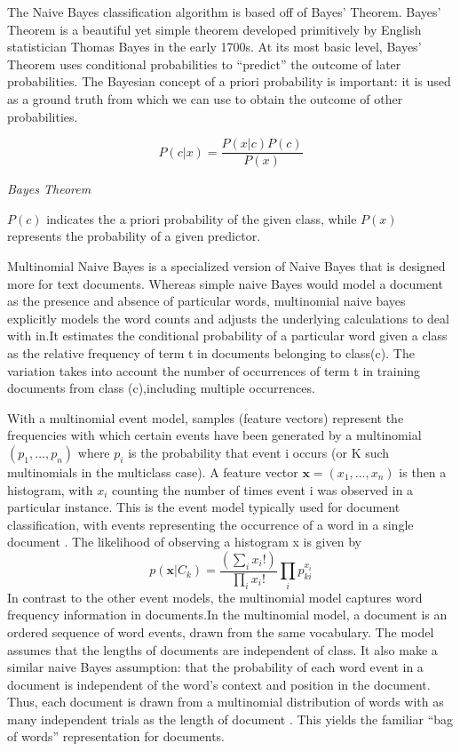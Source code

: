 \documentclass[12pt,a4paper,final]{extreport}
\begin{document}
\vspace{0.5cm}
The Naive Bayes classification algorithm is based off of Bayes’ Theorem. Bayes’ Theorem is a beautiful yet simple theorem developed primitively by English statistician Thomas Bayes in the early 1700s. At its most basic level, Bayes’ Theorem uses conditional probabilities to “predict” the outcome of later probabilities. The Bayesian concept of a priori probability is important: it is used as a ground truth from which we can use to obtain the outcome of other probabilities.
\begin{mycapequ}[!ht] 
\[ P(c|x) = \frac{P(x|c)P(c)}{P(x)} \]
\caption{\textit{Bayes Theorem}}
\end{mycapequ}

$P(c)$ indicates the a priori probability of the given class, while $P(x)$ represents the probability of a given predictor.

\vspace{0.5cm}
Multinomial Naive Bayes is a specialized version of Naive Bayes that is designed more for text documents. Whereas simple naive Bayes would model a document as the presence and absence of particular words, multinomial naive bayes explicitly models the word counts and adjusts the underlying calculations to deal with in.It estimates the conditional probability of a particular word given a class as the relative frequency of term t in documents belonging to class(c). The variation takes into account the number of occurrences of term t in training documents from class (c),including multiple occurrences.

\vspace{0.5cm}
With a multinomial event model, samples (feature vectors) represent the frequencies with which certain events have been generated by a multinomial ${\displaystyle (p_{1},\dots ,p_{n})}$ where $p_{i}$ is the probability that event i occurs (or K such multinomials in the multiclass case). A feature vector ${\displaystyle \mathbf {x} =(x_{1},\dots ,x_{n})}$ is then a histogram, with $x_{i}$ counting the number of times event i was observed in a particular instance. This is the event model typically used for document classification, with events representing the occurrence of a word in a single document . The likelihood of observing a histogram x is given by
\[ 
p(\textbf{x}|C_{k}) = \frac{(\sum_{i}x_{i}!)}{\prod_{i}x_{i}!}\prod_{i}p_{ki}^{x_{i}}
 \]
In contrast to the other event models, the multinomial model captures word frequency information in documents.In the multinomial model, a document is an ordered sequence of word events, drawn from the same vocabulary. The model assumes that the lengths of documents
are independent of class. It also make a similar
naive Bayes assumption: that the probability of each
word event in a document is independent of the word’s
context and position in the document. Thus, each document is drawn from a multinomial distribution of words with as many independent trials as the length of document . This yields the familiar “bag of words” representation for documents.
\end{document}
